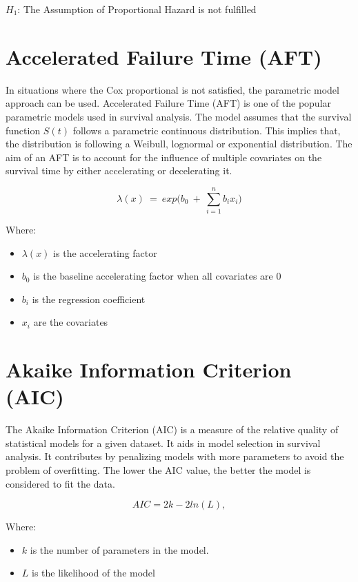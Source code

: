 \documentclass[12pt]{report} %
\begin{document}
                                                            \(H_1\): The Assumption of Proportional Hazard is not fulfilled 


\section{Accelerated Failure Time (AFT)}

In situations where the Cox proportional is not satisfied, the parametric model approach can be used. Accelerated Failure Time (AFT) is one of the popular parametric models used in survival analysis. The model assumes that the survival function \(S(t)\) follows a parametric continuous distribution. This implies that, the distribution is following a Weibull, lognormal or exponential distribution. The aim of an AFT is to account for the influence of multiple covariates on the survival time by either accelerating or decelerating it.

\[\lambda(x)\ =\ exp(b_0\ +\ \sum_{i=1}^{n}{b_ix_i)}\]

Where:
 \begin{itemize}
     \item \(\lambda(x)\) is the accelerating factor
     \item \(b_0 \) is the baseline accelerating factor when all covariates are 0
     \item \(b_i\) is the regression coefficient
     \item \(x_i\) are the covariates

 \end{itemize}
 
\section{Akaike Information Criterion (AIC)}

The Akaike Information Criterion (AIC) is a measure of the relative quality of statistical models for a given dataset. It aids in model selection in survival analysis. It contributes by penalizing models with more parameters to avoid the problem of overfitting. The lower the AIC value, the better the model is considered to fit the data.

\[AIC=2k-2ln(L),\]

Where:
 \begin{itemize}
     \item \(k \) is the number of parameters in the model.
     \item \(L\) is the likelihood of the model
 \end{itemize}
\end{document}
